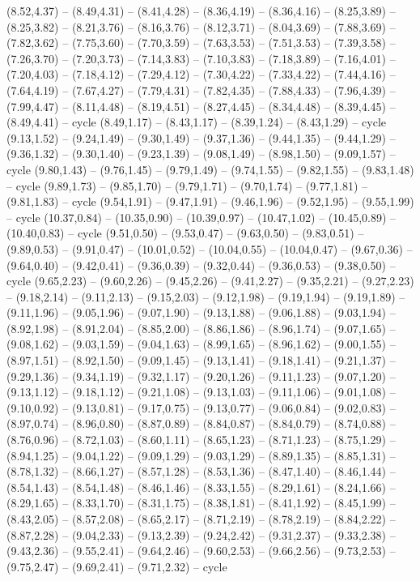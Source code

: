 \expandafter\def\csname geo:gebiet:HUN\endcsname{
  (8.52,4.37) -- (8.49,4.31) -- (8.41,4.28) -- (8.36,4.19) -- (8.36,4.16) -- (8.25,3.89) -- (8.25,3.82) -- (8.21,3.76) -- (8.16,3.76) -- (8.12,3.71) -- (8.04,3.69) -- (7.88,3.69) -- (7.82,3.62) -- (7.75,3.60) -- (7.70,3.59) -- (7.63,3.53) -- (7.51,3.53) -- (7.39,3.58) -- (7.26,3.70) -- (7.20,3.73) -- (7.14,3.83) -- (7.10,3.83) -- (7.18,3.89) -- (7.16,4.01) -- (7.20,4.03) -- (7.18,4.12) -- (7.29,4.12) -- (7.30,4.22) -- (7.33,4.22) -- (7.44,4.16) -- (7.64,4.19) -- (7.67,4.27) -- (7.79,4.31) -- (7.82,4.35) -- (7.88,4.33) -- (7.96,4.39) -- (7.99,4.47) -- (8.11,4.48) -- (8.19,4.51) -- (8.27,4.45) -- (8.34,4.48) -- (8.39,4.45) -- (8.49,4.41) -- cycle}
\expandafter\def\csname geo:gebiet:GRC\endcsname{
  (8.49,1.17) -- (8.43,1.17) -- (8.39,1.24) -- (8.43,1.29) -- cycle
  (9.13,1.52) -- (9.24,1.49) -- (9.30,1.49) -- (9.37,1.36) -- (9.44,1.35) -- (9.44,1.29) -- (9.36,1.32) -- (9.30,1.40) -- (9.23,1.39) -- (9.08,1.49) -- (8.98,1.50) -- (9.09,1.57) -- cycle
  (9.80,1.43) -- (9.76,1.45) -- (9.79,1.49) -- (9.74,1.55) -- (9.82,1.55) -- (9.83,1.48) -- cycle
  (9.89,1.73) -- (9.85,1.70) -- (9.79,1.71) -- (9.70,1.74) -- (9.77,1.81) -- (9.81,1.83) -- cycle
  (9.54,1.91) -- (9.47,1.91) -- (9.46,1.96) -- (9.52,1.95) -- (9.55,1.99) -- cycle
  (10.37,0.84) -- (10.35,0.90) -- (10.39,0.97) -- (10.47,1.02) -- (10.45,0.89) -- (10.40,0.83) -- cycle
  (9.51,0.50) -- (9.53,0.47) -- (9.63,0.50) -- (9.83,0.51) -- (9.89,0.53) -- (9.91,0.47) -- (10.01,0.52) -- (10.04,0.55) -- (10.04,0.47) -- (9.67,0.36) -- (9.64,0.40) -- (9.42,0.41) -- (9.36,0.39) -- (9.32,0.44) -- (9.36,0.53) -- (9.38,0.50) -- cycle
  (9.65,2.23) -- (9.60,2.26) -- (9.45,2.26) -- (9.41,2.27) -- (9.35,2.21) -- (9.27,2.23) -- (9.18,2.14) -- (9.11,2.13) -- (9.15,2.03) -- (9.12,1.98) -- (9.19,1.94) -- (9.19,1.89) -- (9.11,1.96) -- (9.05,1.96) -- (9.07,1.90) -- (9.13,1.88) -- (9.06,1.88) -- (9.03,1.94) -- (8.92,1.98) -- (8.91,2.04) -- (8.85,2.00) -- (8.86,1.86) -- (8.96,1.74) -- (9.07,1.65) -- (9.08,1.62) -- (9.03,1.59) -- (9.04,1.63) -- (8.99,1.65) -- (8.96,1.62) -- (9.00,1.55) -- (8.97,1.51) -- (8.92,1.50) -- (9.09,1.45) -- (9.13,1.41) -- (9.18,1.41) -- (9.21,1.37) -- (9.29,1.36) -- (9.34,1.19) -- (9.32,1.17) -- (9.20,1.26) -- (9.11,1.23) -- (9.07,1.20) -- (9.13,1.12) -- (9.18,1.12) -- (9.21,1.08) -- (9.13,1.03) -- (9.11,1.06) -- (9.01,1.08) -- (9.10,0.92) -- (9.13,0.81) -- (9.17,0.75) -- (9.13,0.77) -- (9.06,0.84) -- (9.02,0.83) -- (8.97,0.74) -- (8.96,0.80) -- (8.87,0.89) -- (8.84,0.87) -- (8.84,0.79) -- (8.74,0.88) -- (8.76,0.96) -- (8.72,1.03) -- (8.60,1.11) -- (8.65,1.23) -- (8.71,1.23) -- (8.75,1.29) -- (8.94,1.25) -- (9.04,1.22) -- (9.09,1.29) -- (9.03,1.29) -- (8.89,1.35) -- (8.85,1.31) -- (8.78,1.32) -- (8.66,1.27) -- (8.57,1.28) -- (8.53,1.36) -- (8.47,1.40) -- (8.46,1.44) -- (8.54,1.43) -- (8.54,1.48) -- (8.46,1.46) -- (8.33,1.55) -- (8.29,1.61) -- (8.24,1.66) -- (8.29,1.65) -- (8.33,1.70) -- (8.31,1.75) -- (8.38,1.81) -- (8.41,1.92) -- (8.45,1.99) -- (8.43,2.05) -- (8.57,2.08) -- (8.65,2.17) -- (8.71,2.19) -- (8.78,2.19) -- (8.84,2.22) -- (8.87,2.28) -- (9.04,2.33) -- (9.13,2.39) -- (9.24,2.42) -- (9.31,2.37) -- (9.33,2.38) -- (9.43,2.36) -- (9.55,2.41) -- (9.64,2.46) -- (9.60,2.53) -- (9.66,2.56) -- (9.73,2.53) -- (9.75,2.47) -- (9.69,2.41) -- (9.71,2.32) -- cycle}
